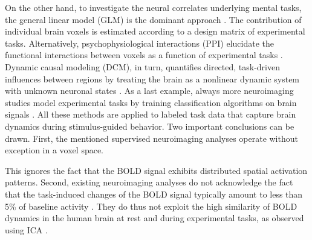 \documentclass{article} %
\begin{document}
On the other hand, to investigate
the neural correlates underlying mental tasks,
the general linear model (GLM) is the dominant approach \cite{friston94}.
The contribution of
individual brain voxels is estimated
according to a design matrix of experimental tasks.
Alternatively, psychophysiological interactions (PPI)
elucidate the functional interactions between voxels as a function
of experimental tasks \cite{friston97}.
Dynamic causal modeling (DCM), in turn, quantifies directed,
task-driven influences between regions
by treating the brain as a nonlinear dynamic system with unknown
neuronal states \cite{stephan04}.
As a last example, always more neuroimaging studies model
experimental tasks by training classification algorithms on brain signals
\cite{poldrack09decoding}.
All these methods are applied to labeled task data that capture brain dynamics
during stimulus-guided behavior.
Two important conclusions can be drawn.
First, the mentioned supervised neuroimaging analyses operate
without exception in a voxel space. 

This ignores the fact that the BOLD
signal exhibits distributed spatial activation patterns.
Second, existing neuroimaging analyses do not acknowledge the fact that the
task-induced changes of the BOLD signal typically amount to less than 5\%
of baseline activity \cite{fox07}. 
%
% 
They do thus not exploit the high similarity
of BOLD dynamics in the human brain at rest and during experimental tasks,
as observed using ICA \cite{smith2009}.
\end{document}
